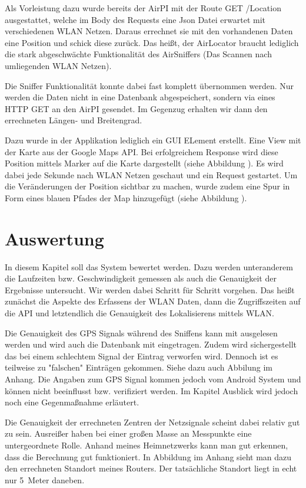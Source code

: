 \documentclass[11pt,a4paper]{article}
\begin{document}
Als Vorleistung dazu wurde bereits der AirPI mit der Route GET /Location ausgestattet, welche im Body des Requests eine Json Datei erwartet mit verschiedenen WLAN Netzen. Daraus errechnet sie mit den vorhandenen Daten eine Position und schick diese zurück. Das heißt, der AirLocator braucht lediglich die stark abgeschwächte Funktionalität des AirSniffers (Das Scannen nach umliegenden WLAN Netzen).

Die Sniffer Funktionalität konnte dabei fast komplett übernommen werden. Nur werden die Daten nicht in eine Datenbank abgespeichert, sondern via eines HTTP GET an den AirPI gesendet. Im Gegenzug erhalten wir dann den errechneten Längen- und Breitengrad. 

Dazu wurde in der Applikation lediglich ein GUI ELement erstellt. Eine View mit der Karte aus der Google Maps API. Bei erfolgreichem Response wird diese Position mittels Marker auf die Karte dargestellt (siehe Abbildung
). Es wird dabei jede Sekunde nach WLAN Netzen geschaut und ein Request gestartet. Um die Veränderungen der Position sichtbar zu machen, wurde zudem eine Spur in Form eines blauen Pfades der Map hinzugefügt (siehe Abbildung
). 

\section{Auswertung}

In diesem Kapitel soll das System bewertet werden. Dazu werden unteranderem die Laufzeiten bzw. Geschwindigkeit gemessen als auch die Genauigkeit der Ergebnisse untersucht. Wir werden dabei Schritt für Schritt vorgehen. Das heißt zunächst die Aspekte des Erfassens der WLAN Daten, dann die Zugriffszeiten auf die API und letztendlich die Genauigkeit des Lokalisierens mittels WLAN.

Die Genauigkeit des GPS Signals während des Sniffens kann mit ausgelesen werden und wird auch die Datenbank mit eingetragen. Zudem wird sichergestellt das bei einem schlechtem Signal der Eintrag verworfen wird. Dennoch ist es teilweise zu "falschen" Einträgen gekommen. Siehe dazu auch Abbilung 
im Anhang. Die Angaben zum GPS Signal kommen jedoch vom Android System und können nicht beeinflusst bzw. verifiziert werden. Im Kapitel Ausblick wird jedoch noch eine Gegenmaßnahme erläutert.

Die Genauigkeit der errechneten Zentren der Netzsignale scheint dabei relativ gut zu sein. Ausreißer haben bei einer großen Masse an Messpunkte eine untergeordnete Rolle. Anhand meines Heimnetzwerks kann man gut erkennen, dass die Berechnung gut funktioniert. In Abbildung 
im Anhang sieht man dazu den errechneten Standort meines Routers. Der tatsächliche Standort liegt in echt nur 5~Meter daneben.
\end{document}
